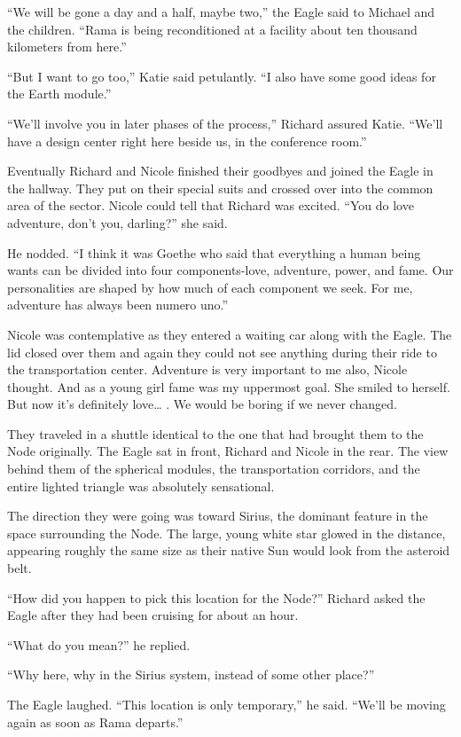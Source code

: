 \documentclass[]{article}
\begin{document}
{“We will be gone a day and a half, maybe two,” the Eagle said to Michael and the children. “Rama is being reconditioned at a facility about ten thousand kilometers from here.”

“But I want to go too,” Katie said petulantly. “I also have some good ideas for the Earth module.”

“We’ll involve you in later phases of the process,” Richard assured Katie. “We’ll have a design center right here beside us, in the conference room.”

Eventually Richard and Nicole finished their goodbyes and joined the Eagle in the hallway. They put on their special suits and crossed over into the common area of the sector. Nicole could tell that Richard was excited. “You do love adventure, don’t you, darling?” she said.

He nodded. “I think it was Goethe who said that everything a human being wants can be divided into four components-love, adventure, power, and fame. Our personalities are shaped by how much of each component we seek. For me, adventure has always been numero uno.”

Nicole was contemplative as they entered a waiting car along with the Eagle. The lid closed over them and again they could not see anything during their ride to the transportation center. Adventure is very important to me also, Nicole thought. And as a young girl fame was my uppermost goal. She smiled to herself. But now it’s definitely love… . We would be boring if we never changed.

They traveled in a shuttle identical to the one that had brought them to the Node originally. The Eagle sat in front, Richard and Nicole in the rear. The view behind them of the spherical modules, the transportation corridors, and the entire lighted triangle was absolutely sensational.

The direction they were going was toward Sirius, the dominant feature in the space surrounding the Node. The large, young white star glowed in the distance, appearing roughly the same size as their native Sun would look from the asteroid belt.

“How did you happen to pick this location for the Node?” Richard asked the Eagle after they had been cruising for about an hour.

“What do you mean?” he replied.

“Why here, why in the Sirius system, instead of some other place?”

The Eagle laughed. “This location is only temporary,” he said. “We’ll be moving again as soon as Rama departs.”

}
\end{document}
